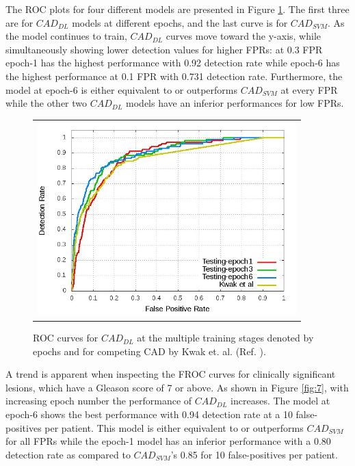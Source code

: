 The ROC plots for four different models are presented in Figure \ref{fig:6}. The first three are for $CAD_{DL}$ models at different epochs, and the last curve is for $CAD_{SVM}$. As the model continues to train, $CAD_{DL}$ curves move toward the y-axis, while simultaneously showing lower detection values for higher FPRs: at 0.3 FPR epoch-1 has the highest performance with 0.92 detection rate while epoch-6 has the highest performance at 0.1 FPR with 0.731 detection rate. Furthermore, the model at epoch-6 is either equivalent to or outperforms $CAD_{SVM}$ at every FPR while the other two $CAD_{DL}$ models have an inferior performances for low FPRs.     
\begin{figure} [ht]
   \begin{center}
   \begin{tabular}{c}
   \includegraphics[height=7.5cm]{Figure6}
   \end{tabular}
   \end{center}
   \caption[Fig6]
   { \label{fig:6} 
ROC curves for  $CAD_{DL}$ at the multiple training stages denoted by epochs and for competing CAD by Kwak et. al. (Ref. ).}
   \end{figure}
A trend is apparent when inspecting the FROC curves for clinically significant lesions, which have a Gleason score of 7 or above. As shown in Figure \ref{fig:7}, with increasing epoch number the performance of $CAD_{DL}$ increases. The model at epoch-6 shows the best performance with 0.94 detection rate at a 10 false-positives per patient. This model is either equivalent to or outperforms $CAD_{SVM}$ for all FPRs while the epoch-1 model has an inferior performance with a 0.80 detection rate as compared to $CAD_{SVM}$'s  0.85 for 10 false-positives per patient. 

